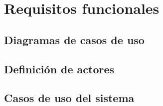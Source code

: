 \section{Requisitos funcionales}


\subsection{Diagramas de casos de uso}

\subsection{Definición de actores}

\subsection{Casos de uso del sistema}

